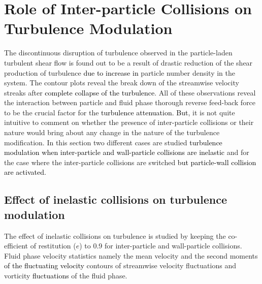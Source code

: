 \documentclass[aip,graphicx]{revtex4-1}
\begin{document}
\section{Role of Inter-particle Collisions on Turbulence Modulation}
The discontinuous disruption of turbulence observed in the particle-laden turbulent shear flow is found out to be a result of drastic reduction of the shear production of turbulence \textcolor{black}{due to increase in} particle number density in the system. The contour plots reveal the break down of the streamwise velocity streaks after \textcolor{black}{complete collapse of the turbulence}. All of these observations reveal the interaction between particle and fluid phase thorough reverse feed-back force to be the crucial factor for the \textcolor{black}{turbulence attenuation. But}, it is not quite intuitive to comment on whether the presence of inter-particle collisions or their nature would bring about any change in the nature of the turbulence modification. In this section two different cases are studied \textcolor{black}{turbulence modulation when inter-particle and wall-particle collisions are inelastic} and for the case where the inter-particle collisions are switched \textcolor{black}{but particle-wall collision are activated.}   
\subsection{Effect of inelastic collisions on turbulence modulation}
\label{sec:inelastic_collision_2way}
The effect of inelastic collisions on turbulence is studied by keeping the co-efficient of restitution ($e$) to 0.9 for inter-particle and wall-particle collisions. Fluid phase velocity statistics namely the mean velocity and the second moments \textcolor{black}{of the fluctuating velocity} contours of streamwise velocity fluctuations and vorticity \textcolor{black}{fluctuations} of the fluid phase.
\end{document}
